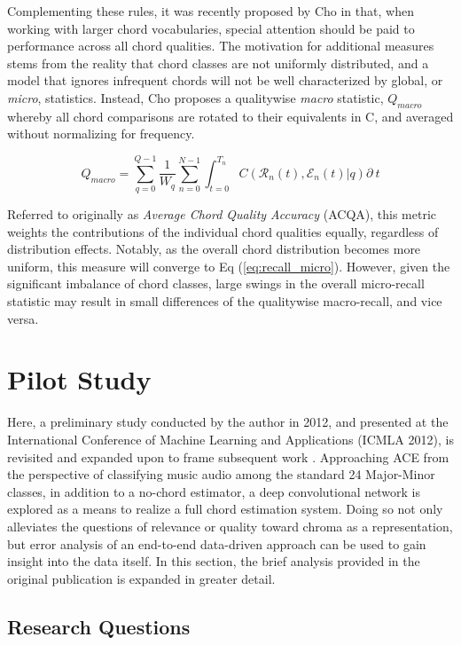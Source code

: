 Complementing these rules, it was recently proposed by Cho in \cite{Cho2014PhD} that, when working with larger chord vocabularies, special attention should be paid to performance across all chord qualities.
The motivation for additional measures stems from the reality that chord classes are not uniformly distributed, and a model that ignores infrequent chords will not be well characterized by global, or \emph{micro}, statistics.
Instead, Cho proposes a qualitywise \emph{macro} statistic, $Q_{macro}$ whereby all chord comparisons are rotated to their equivalents in C, and averaged without normalizing for frequency.

\begin{equation}
Q_{macro} = \sum_{q=0}^{Q-1}\frac{1}{W_q}\sum_{n=0}^{N-1}\int_{t=0}^{T_n}C(\mathcal{R}_n(t), \mathcal{E}_n(t) | q)\partial~t
\end{equation}

\noindent Referred to originally as \emph{Average Chord Quality Accuracy} (ACQA), this metric weights the contributions of the individual chord qualities equally, regardless of distribution effects.
Notably, as the overall chord distribution becomes more uniform, this measure will converge to Eq (\ref{eq:recall_micro}).
However, given the significant imbalance of chord classes, large swings in the overall micro-recall statistic may result in small differences of the qualitywise macro-recall, and vice versa.


\section{Pilot Study}
\label{sec:pilot_study}

Here, a preliminary study conducted by the author in 2012, and presented at the International Conference of Machine Learning and Applications (ICMLA 2012), is revisited and expanded upon to frame subsequent work \cite{Humphrey2012}.
Approaching ACE from the perspective of classifying music audio among the standard 24 Major-Minor classes, in addition to a no-chord estimator, a deep convolutional network is explored as a means to realize a full chord estimation system.
Doing so not only alleviates the questions of relevance or quality toward chroma as a representation, but error analysis of an end-to-end data-driven approach can be used to gain insight into the data itself.
In this section, the brief analysis provided in the original publication is expanded in greater detail.


\subsection{Research Questions}
\label{subsec:research_questions}

